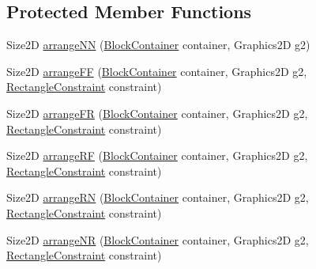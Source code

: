 \subsection*{Protected Member Functions}
\begin{DoxyCompactItemize}
\item 
Size2D \mbox{\hyperlink{classorg_1_1jfree_1_1chart_1_1block_1_1_grid_arrangement_a1df9d2bb1d89cb2294574355d9177d89}{arrange\+NN}} (\mbox{\hyperlink{classorg_1_1jfree_1_1chart_1_1block_1_1_block_container}{Block\+Container}} container, Graphics2D g2)
\item 
Size2D \mbox{\hyperlink{classorg_1_1jfree_1_1chart_1_1block_1_1_grid_arrangement_aab0d583355f47f4a68a780f69791236d}{arrange\+FF}} (\mbox{\hyperlink{classorg_1_1jfree_1_1chart_1_1block_1_1_block_container}{Block\+Container}} container, Graphics2D g2, \mbox{\hyperlink{classorg_1_1jfree_1_1chart_1_1block_1_1_rectangle_constraint}{Rectangle\+Constraint}} constraint)
\item 
Size2D \mbox{\hyperlink{classorg_1_1jfree_1_1chart_1_1block_1_1_grid_arrangement_a8051b388e421b5e0bafd3cc496c31f71}{arrange\+FR}} (\mbox{\hyperlink{classorg_1_1jfree_1_1chart_1_1block_1_1_block_container}{Block\+Container}} container, Graphics2D g2, \mbox{\hyperlink{classorg_1_1jfree_1_1chart_1_1block_1_1_rectangle_constraint}{Rectangle\+Constraint}} constraint)
\item 
Size2D \mbox{\hyperlink{classorg_1_1jfree_1_1chart_1_1block_1_1_grid_arrangement_ac9b0d79b636c5b108a1912c53c70d600}{arrange\+RF}} (\mbox{\hyperlink{classorg_1_1jfree_1_1chart_1_1block_1_1_block_container}{Block\+Container}} container, Graphics2D g2, \mbox{\hyperlink{classorg_1_1jfree_1_1chart_1_1block_1_1_rectangle_constraint}{Rectangle\+Constraint}} constraint)
\item 
Size2D \mbox{\hyperlink{classorg_1_1jfree_1_1chart_1_1block_1_1_grid_arrangement_a02c995adee04f1e5bd6aae52614ead93}{arrange\+RN}} (\mbox{\hyperlink{classorg_1_1jfree_1_1chart_1_1block_1_1_block_container}{Block\+Container}} container, Graphics2D g2, \mbox{\hyperlink{classorg_1_1jfree_1_1chart_1_1block_1_1_rectangle_constraint}{Rectangle\+Constraint}} constraint)
\item 
Size2D \mbox{\hyperlink{classorg_1_1jfree_1_1chart_1_1block_1_1_grid_arrangement_a2b686ed7f078b1b5bf65256459746deb}{arrange\+NR}} (\mbox{\hyperlink{classorg_1_1jfree_1_1chart_1_1block_1_1_block_container}{Block\+Container}} container, Graphics2D g2, \mbox{\hyperlink{classorg_1_1jfree_1_1chart_1_1block_1_1_rectangle_constraint}{Rectangle\+Constraint}} constraint)

\end{DoxyCompactItemize}
